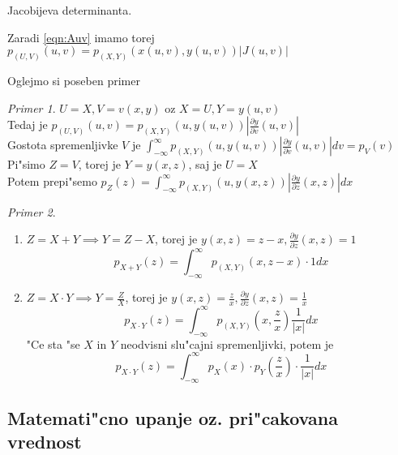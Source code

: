 \documentclass[a4paper,12pt]{article}
\theoremstyle{definition}
\theoremstyle{remark}
\newtheorem*{ex}{Primer}
\begin{document}
Jacobijeva determinanta.

Zaradi \ref{eqn:Auv} imamo torej $p_{(U,V)}(u,v) = p_{(X,Y)}(x(u,v), y(u,v)) |J(u,v)|$

Oglejmo si poseben primer

\begin{ex}
    $U = X, V = v(x,y)$ oz $X = U, Y = y(u,v)$ \\
    Tedaj je $p_{(U,V)}(u,v) = p_{(X,Y)}(u, y(u,v)) |\frac{\partial y}{\partial v}(u,v)|$ \\
    Gostota spremenljivke $V$ je $\int_{-\infty}^{\infty}  p_{(X,Y)}(u, y(u,v)) |\frac{\partial y}{\partial v}(u,v)| dv =
    p_V(v)$ \\
    Pi"simo $Z = V$, torej je $Y = y(x,z)$, saj je $U=X$ \\
    Potem prepi"semo $p_Z(z) = \int_{-\infty}^{\infty}  p_{(X,Y)}(u, y(x,z)) |\frac{\partial y}{\partial z}(x,z)| dx$
\end{ex}

\begin{ex} \text{} \\
    \begin{enumerate}
        \item $Z = X + Y \implies Y = Z - X$, torej je $y(x,z) = z - x, \frac{\partial y}{\partial z}(x,z) = 1$
            \begin{equation*}
                p_{X+Y}(z) = \int_{-\infty}^{\infty} p_{(X,Y)}(x,z-x) \cdot 1 dx
            \end{equation*}
        \item $Z = X \cdot Y \implies Y = \frac{Z}{X}$, torej je $y(x,z) = \frac{z}{x},
            \frac{\partial y}{\partial z}(x,z) = \frac{1}{x}$
            \begin{equation*}
                p_{X \cdot Y}(z) = \int_{-\infty}^{\infty} p_{(X,Y)}(x,\frac{z}{x}) \frac{1}{|x|} dx
            \end{equation*}
            "Ce sta "se $X$ in $Y$ neodvisni slu"cajni spremenljivki, potem je
            \begin{equation*}
                p_{X \cdot Y}(z) = \int_{-\infty}^{\infty} p_X(x) \cdot p_Y(\frac{z}{x}) \cdot \frac{1}{|x|} dx
            \end{equation*}
    \end{enumerate}
\end{ex}

\subsection{Matemati"cno upanje oz. pri"cakovana vrednost}
\end{document}
